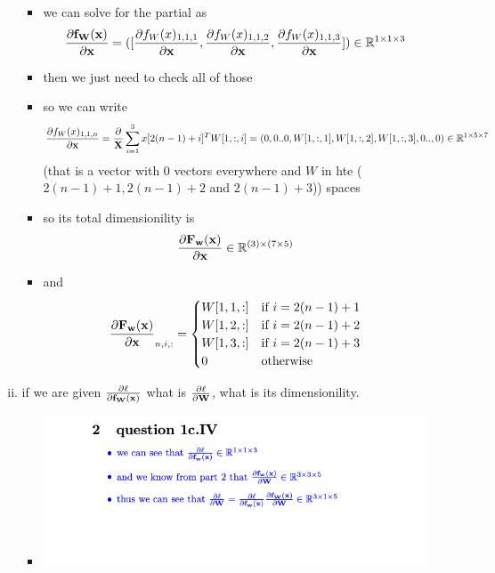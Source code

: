 \documentclass{article}
\begin{document}
\begin{enumerate}[(a)]
\begin{enumerate}[i.]
\begin{itemize}
        \item we can solve for the partial as $$\frac{\partial \bold{f_W(x)}}{\partial \bold{x}}=([\frac{\partial {f_W(x)_{1,1,1}}}{\partial \bold{x}}, \frac{\partial {f_W(x)_{1,1,2}}}{\partial \bold{x}}, \frac{\partial {f_W(x)_{1,1,3}}}{\partial \bold{x}}])\in \mathbb{R}^{1\times 1\times 3}$$
        \item then we just need to check all of those 
        \item so we can write $$\frac{\partial {f_W(x)_{1,1,n}}}{\partial \bold{x}}=\frac{\partial }{\bold{X}}\sum_{i=1}^{3}x[2(n-1) + i]^{T}W[1,:,i]=(0,0..0,W[1,:,1],W[1,:,2],W[1,:,3],0..,0)\in \mathbb{R}^{1\times 5 \times 7}$$ (that is a vector with 0 vectors everywhere and $W$ in hte ($2(n-1)+1, 2(n-1)+2$ and $2(n-1)+3$)) spaces
        \item so its total dimensionility is $$\frac{\partial \bold{F_{w}(x)}}{\partial \bold{x}}\in\mathbb{R}^{(3)\times(7\times 5)}$$
        \item and $$\frac{\partial \bold{F_{w}(x)}}{\partial \bold{x}}_{n,i,:}=\begin{cases}
        W[1,1,:] & \text{if } i = 2(n-1)+1\\
        W[1,2,:] & \text{if } i = 2(n-1)+2\\
        W[1,3,:] & \text{if } i = 2(n-1)+3\\
        0 & \text{otherwise}
        \end{cases}$$
    \end{itemize}
    \item if we are given $\frac{\partial \ell}{\partial \bold{f_W(x)}}$ what is $\frac{\partial \ell}{\partial \bold{W}}$, what is its dimensionility.
    \begin{itemize}
        \color{blue}
        \item \includegraphics*{./assigment_screenshots/part_2.png}

\end{itemize}
\end{enumerate}
\end{enumerate}
\end{document}
